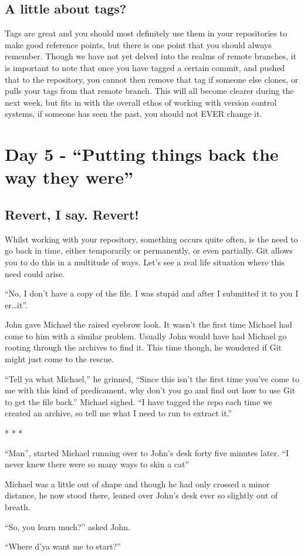 \begin{framed}
\subsection{A little about tags?}
Tags are great and you should most definitely use them in your repositories to make good reference points, but there is one point that you should always remember.  Though we have not yet delved into the realms of remote branches, it is important to note that once you have tagged a certain commit, and pushed that to the repository, you cannot then remove that tag if someone else clones, or pulls your tags from that remote branch.  This will all become clearer during the next week, but fits in with the overall ethos of working with version control systems, if someone has seen the past, you should not EVER change it.
\end{framed}

\section{Day 5 - ``Putting things back the way they were''}
\subsection{Revert, I say.  Revert!}

Whilst working with your repository, something occurs quite often, is the need to go back in time, either temporarily or permanently, or even partially.  Git allows you to do this in a multitude of ways.  Let's see a real life situation where this need could arise.

\begin{trenches}
``No, I don't have a copy of the file.  I was stupid and after I submitted it to you I er\ldots\deleted it''.  

John gave Michael the raised eyebrow look.  It wasn't the first time Michael had come to him with a similar problem.  Usually John would have had Michael go rooting through the archives to find it.  This time though, he wondered if Git might just come to the rescue.

``Tell ya what Michael,'' he grinned, ``Since this isn't the first time you've come to me with this kind of predicament, why don't you go and find out how to use Git to get the file back.''  Michael sighed.  ``I have tagged the repo each time we created an archive, so tell me what I need to run to extract it.''

\begin{center} * * * \end{center}

``Man'', started Michael running over to John's desk forty five minutes later.  ``I never knew there were so many ways to skin a cat''

Michael was a little out of shape and though he had only crossed a minor distance, he now stood there, leaned over John's desk ever so slightly out of breath.

``So, you learn much?'' asked John.

``Where d'ya want me to start?''

\end{trenches}

